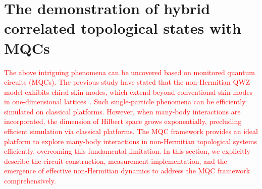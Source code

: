 \documentclass[longbibliography, aps, prx, amsmath, amssymb, amsfonts, twocolumn,superscriptaddress, footinbib]{revtex4-1}
\begin{document}
    
\section{The demonstration of hybrid correlated topological states with MQCs}
	\label{sec:MQC_demo}
	
	\textcolor{red}{The above intriguing phenomena can be uncovered based on 
monitored quantum circuits (MQCs). The previous study have stated that 
the non-Hermitian QWZ model exhibits chiral skin modes, which extend beyond 
conventional skin modes in one-dimensional lattices~\cite{nakamura2023universal, 
ma2024non,schindler2023hermitian}. Such single-particle phenomena can be 
efficiently simulated on classical platforms. However, when 
many-body interactions are incorporated, the dimension of Hilbert space grows 
exponentially, precluding efficient simulation via classical platforms.
The MQC framework provides an ideal platform to explore many-body 
interactions in non-Hermitian topological systems efficiently, overcoming 
this fundamental limitation. In this section, we explicitly describe the circuit 
construction, measurement implementation, and the emergence of effective 
non-Hermitian dynamics to address the MQC framework comprehensively.}
\end{document}
